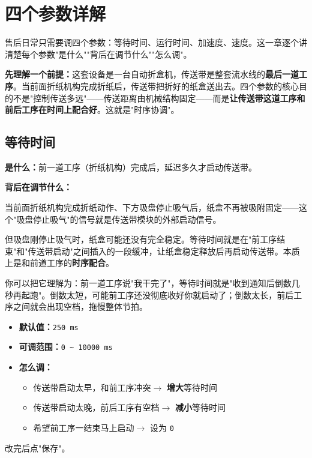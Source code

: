 \section{四个参数详解}

售后日常只需要调四个参数：等待时间、运行时间、加速度、速度。这一章逐个讲清楚每个参数"是什么""背后在调节什么""怎么调"。

\textbf{先理解一个前提：}这套设备是一台自动折盒机，传送带是整套流水线的\textbf{最后一道工序}。当前面折纸机构完成折纸后，传送带把折好的纸盒送出去。四个参数的核心目的不是"控制传送多远"——传送距离由机械结构固定——而是\textbf{让传送带这道工序和前后工序在时间上配合好}。这就是"时序协调"。

\subsection{等待时间}

\textbf{是什么：}前一道工序（折纸机构）完成后，延迟多久才启动传送带。

\textbf{背后在调节什么：}

当前面折纸机构完成折纸动作、下方吸盘停止吸气后，纸盒不再被吸附固定——这个"吸盘停止吸气"的信号就是传送带模块的外部启动信号。

但吸盘刚停止吸气时，纸盒可能还没有完全稳定。等待时间就是在"前工序结束"和"传送带启动"之间插入的一段缓冲，让纸盒稳定释放后再启动传送带。本质上是和前道工序的\textbf{时序配合}。

你可以把它理解为：前一道工序说"我干完了"，等待时间就是"收到通知后倒数几秒再起跑"。倒数太短，可能前工序还没彻底收好你就启动了；倒数太长，前后工序之间就会出现空档，拖慢整体节拍。

\begin{itemize}
    \item \textbf{默认值：}\texttt{250 ms}
    \item \textbf{可调范围：}\texttt{0 \textasciitilde{} 10000 ms}
    \item \textbf{怎么调：}
    \begin{itemize}
        \item 传送带启动太早，和前工序冲突$\rightarrow$ \textbf{增大}等待时间
        \item 传送带启动太晚，前后工序有空档$\rightarrow$ \textbf{减小}等待时间
        \item 希望前工序一结束马上启动$\rightarrow$ 设为 \texttt{0}
    \end{itemize}
\end{itemize}

改完后点"保存"。

